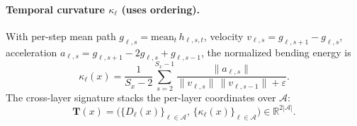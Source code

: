 \documentclass[11pt]{article}
\theoremstyle{definition}
\newcommand{\Tmat}{\mathbf{T}}
\newcommand{\R}{\mathbb{R}}
\newcommand{\Aset}{\mathcal{A}}
\begin{document}
\paragraph{Temporal curvature $\kappa_\ell$ (uses ordering).}
With per-step mean path $g_{\ell,s}=\mathrm{mean}_t\,h_{\ell,s,t}$, velocity
$v_{\ell,s}=g_{\ell,s+1}-g_{\ell,s}$, acceleration $a_{\ell,s}=g_{\ell,s+1}-2g_{\ell,s}+
g_{\ell,s-1}$, the normalized bending energy is
\begin{equation}
\kappa_\ell(x)=\frac{1}{S_x-2}\sum_{s=2}^{S_x-1}\frac{\lVert a_{\ell,s}\rVert}{\lVert v_{\ell,s}\rVert\,\lVert v_{\ell,s-1}\rVert+\varepsilon}.
\label{eq:curv}
\end{equation}
The cross-layer signature stacks the per-layer coordinates over $\Aset$:
\begin{equation}
\Tmat(x)=\big(\{D_\ell(x)\}_{\ell\in\Aset},\,\{\kappa_\ell(x)\}_{\ell\in\Aset}\big)\in\R^{2|\Aset|}.
\label{eq:T}
\end{equation}
\end{document}
